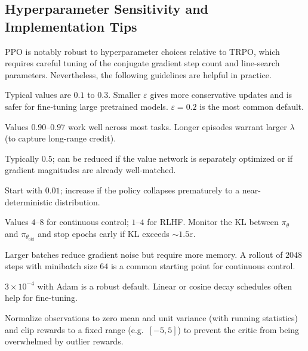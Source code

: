 \subsection{Hyperparameter Sensitivity and Implementation Tips}

PPO is notably robust to hyperparameter choices relative to TRPO, which
requires careful tuning of the conjugate gradient step count and
line-search parameters.  Nevertheless, the following guidelines are helpful
in practice.

\begin{description}[leftmargin=!, labelwidth=3.5cm]
  \item[Clip parameter $\varepsilon$] Typical values are $0.1$ to $0.3$.
    Smaller $\varepsilon$ gives more conservative updates and is safer for
    fine-tuning large pretrained models.  $\varepsilon = 0.2$ is the most
    common default.
  \item[GAE $\lambda$] Values $0.90$--$0.97$ work well across most tasks.
    Longer episodes warrant larger $\lambda$ (to capture long-range credit).
  \item[Value coefficient $c_v$] Typically $0.5$; can be reduced if the
    value network is separately optimized or if gradient magnitudes are
    already well-matched.
  \item[Entropy coefficient $c_H$] Start with $0.01$; increase if the
    policy collapses prematurely to a near-deterministic distribution.
  \item[Epochs per batch $K_e$] Values $4$--$8$ for continuous control;
    $1$--$4$ for RLHF.  Monitor the KL between $\pi_\theta$ and
    $\pi_{\theta_\mathrm{old}}$ and stop epochs early if KL exceeds
    $\sim 1.5\varepsilon$.
  \item[Batch and minibatch size] Larger batches reduce gradient noise but
    require more memory.  A rollout of $2048$ steps with minibatch size $64$
    is a common starting point for continuous control.
  \item[Learning rate] $3 \times 10^{-4}$ with Adam is a robust default.
    Linear or cosine decay schedules often help for fine-tuning.
  \item[Observation normalization] Normalize observations to zero mean and
    unit variance (with running statistics) and clip rewards to a fixed
    range (e.g.\ $[-5, 5]$) to prevent the critic from being overwhelmed
    by outlier rewards.
\end{description}

